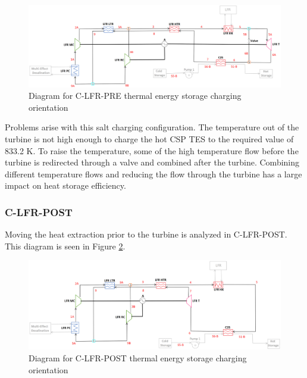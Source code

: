 \begin{figure}[H]
    \widefigure
    \includegraphics[width=\linewidth]{Definitions/c-lfr-pre.pdf}
    \caption{Diagram for C-LFR-PRE thermal energy storage charging orientation\label{c-lfr-pre}}
\end{figure}
\begin{paracol}{2}
\linenumbers
\switchcolumn

Problems arise with this salt charging configuration. The temperature out of the turbine is not high enough to charge the hot CSP TES to the required value of 833.2 K. To raise the temperature, some of the high temperature flow before the turbine is redirected through a valve and combined after the turbine. Combining different temperature flows and reducing the flow through the turbine has a large impact on heat storage efficiency. 



\subsubsection{C-LFR-POST} 

Moving the heat extraction prior to the turbine is analyzed in C-LFR-POST. This diagram is seen in Figure \ref{c-lfr-post}.

\end{paracol}
\begin{figure}[H]
    \widefigure
    \includegraphics[width=\linewidth]{Definitions/c-lfr-post.pdf}
    \caption{Diagram for C-LFR-POST thermal energy storage charging orientation\label{c-lfr-post}}
\end{figure}
